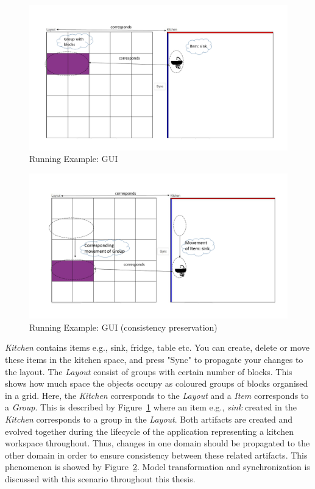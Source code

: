 \begin{figure}
	\includegraphics[width=1\textwidth]{figures/KitchenToGrid}
	\caption{Running Example: GUI}
	\label{fig:Running_Example_GUI}
\end{figure}

\begin{figure}
	\includegraphics[width=1\textwidth]{figures/KitchenToGrid_consistency}
	\caption{Running Example: GUI (consistency preservation)}
	\label{fig:Running_Example_GUI_consistency}
\end{figure}

\textit{Kitchen} contains items e.g., sink, fridge, table etc. You can create, delete or move these items in the kitchen space, and press "Sync" to propagate your changes to the layout. The \textit{Layout} consist of groups with certain number of blocks. This shows how much space the objects occupy as coloured groups of blocks organised in a grid. Here, the \textit{Kitchen} corresponds to the \textit{Layout} and a \textit{Item} corresponds to a \textit{Group}. This is described by Figure~\ref{fig:Running_Example_GUI} where an item e.g., \textit{sink} created in the \textit{Kitchen} corresponds to a group in the \textit{Layout}.
\newline\newline Both artifacts are created and evolved together during the lifecycle of the application representing a kitchen workspace throughout. Thus, changes in one domain should be propagated to the other domain in order to ensure consistency between these related artifacts. This phenomenon is showed by Figure~\ref{fig:Running_Example_GUI_consistency}.
\newline\newline Model transformation and synchronization is discussed with this scenario throughout this thesis. 

